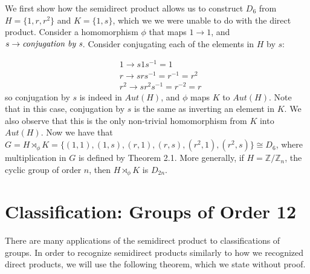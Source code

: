 \documentclass[11pt]{article}
\newcommand{\Z}{\mathbb{Z}}
\begin{document}
We first show how the semidirect product allows us to construct $D_6$ from $H = \{1,r, r^2\}$ and $K = \{ 1, s\}$, which we we were unable to do with the direct product. Consider a homomorphism $\phi$ that maps $1 \to 1$, and $s \to \emph{conjugation by s}$. Consider conjugating each of the elements in $H$ by $s$:

\begin{align}
&1 \to s 1 s^{-1} = 1 \\
&r \to s r s^{-1} = r^{-1} = r^2 \\
&r^2 \to s r^2 s^{-1} = r^{-2} = r
\end{align}
so conjugation by $s$ is indeed in $Aut(H)$, and $\phi$ maps $K$ to $Aut(H)$. Note that in this case, conjugation by $s$ is the same as inverting an element in $K$. We also observe that this is the only non-trivial homomorphism from $K$ into $Aut(H)$. Now we have that $G = H \rtimes_{\phi} K = \{(1,1), (1,s), (r,1), (r,s), (r^2,1), (r^2,s) \} \cong D_6$, where multiplication in $G$ is defined by Theorem 2.1.
More generally, if $H = \Z / \Z_n$, the cyclic group of order $n$, then $H \rtimes_{\phi} K$ is $D_{2n}$.

\section{Classification: Groups of Order 12}
There are many applications of the semidirect product to classifications of groups. In order to recognize semidirect products similarly to how we recognized direct products, we will use the following theorem, which we state without proof. 
\end{document}
